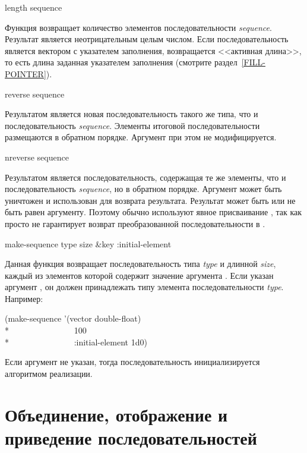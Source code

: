 \begin{defun}[Функция]
length sequence

Функция возвращает количество элементов последовательности
\emph{sequence}. Результат является неотрицательным целым числом.
Если последовательность является вектором с указателем заполнения, возвращается
<<активная длина>>, то есть длина заданная указателем заполнения (смотрите
раздел~\ref{FILL-POINTER}).
\end{defun}

\begin{defun}[Функция]
reverse sequence

Результатом является новая последовательность такого же типа, что и
последовательность \emph{sequence}. Элементы итоговой последовательности
размещаются в обратном порядке.
Аргумент при этом не модифицируется.
\end{defun}

\begin{defun}[Функция]
nreverse sequence

Результатом является последовательность, содержащая те же элементы, что и
последовательность \emph{sequence}, но в обратном порядке. Аргумент может быть
уничтожен и использован для возврата результата. Результат может быть или не
быть равен  аргументу. Поэтому обычно используют явное присваивание
, так как просто  не гарантирует
возврат преобразованной последовательности в .
\end{defun}

\begin{defun}[Функция]
make-sequence type size &key :initial-element

Данная функция возвращает последовательность типа \emph{type} и длинной
\emph{size}, каждый из элементов которой содержит значение аргумента
.
Если указан аргумент , он должен принадлежать типу элемента
последовательности \emph{type}.
Например:
\begin{lisp}
(make-sequence '(vector double-float) \\*
~~~~~~~~~~~~~~~100 \\*
~~~~~~~~~~~~~~~:initial-element 1d0)
\end{lisp}
Если аргумент  не указан, тогда последовательность
инициализируется алгоритмом реализации.
\end{defun}

\section{Объединение, отображение и приведение последовательностей}

